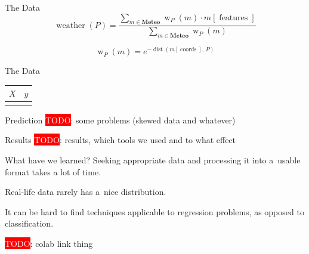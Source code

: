 \documentclass[aspectratio=169,compress,14pt]{beamer}
\newcommand{\TODO}[1]{\colorbox{red}{\textcolor{white}{TODO}}: #1}
\begin{document}
\begin{frame}{The Data}
  \Large
  \begin{equation*}
    \operatorname{weather}(P) =
    \frac{
      \sum\nolimits_{m \in \textbf{Meteo}} \operatorname{w}_P(m) \cdot m[\operatorname{features}]
    }{
      \sum\nolimits_{m \in \textbf{Meteo}}\operatorname{w}_P(m)
    }
  \end{equation*}
  \bigskip\pause

  \begin{equation*}
    \operatorname{w}_P(m) = e^{-\operatorname{dist}(m[\operatorname{coords}],\, P)}
  \end{equation*}
\end{frame}

\begin{frame}{The Data}
  \huge
  \centering
  \begin{tabular}{c|c}
    \(X\) & \(y\) \\\hline
    \raisebox{-.3cm}{\faSunO \: \faCloud} & \raisebox{-.3cm}{\faTrain \kern1pt \faClockO}
  \end{tabular}
\end{frame}

\begin{frame}{Prediction}
  \TODO{some problems (skewed data and whatever)}
\end{frame}

\begin{frame}{Results}
  \TODO{results, which tools we used and to what effect}
\end{frame}

\begin{frame}{What have we learned?}
  Seeking appropriate data and processing it into a~usable format takes a lot of time.
  \vfill\pause

  Real-life data rarely has a~nice distribution.
  \vfill\pause

  It can be hard to find techniques applicable to regression problems, as
  opposed to classification.
\end{frame}

\begin{frame}{}
  \TODO{colab link thing}
\end{frame}
\end{document}
